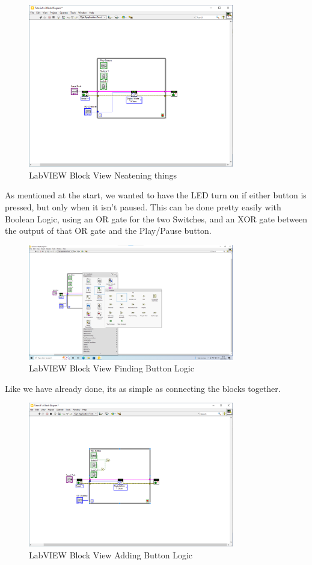 \documentclass[a4paper,11pt]{report}
\begin{document}
\begin{figure}[H]
\centering
\includegraphics[width=0.8\textwidth]{screenshots/labview23}
\caption{LabVIEW Block View Neatening things}
\end{figure}

As mentioned at the start, we wanted to have the LED turn on if either button is pressed, but only when it isn't paused. This can be done pretty easily with Boolean Logic, using an OR gate for the two Switches, and an XOR gate between the output of that OR gate and the Play/Pause button.

\begin{figure}[H]
\centering
\includegraphics[width=0.8\textwidth]{screenshots/labview24}
\caption{LabVIEW Block View Finding Button Logic}
\end{figure}

Like we have already done, its as simple as connecting the blocks together.

\begin{figure}[H]
\centering
\includegraphics[width=0.8\textwidth]{screenshots/labview25}
\caption{LabVIEW Block View Adding Button Logic}
\end{figure}
\end{document}
